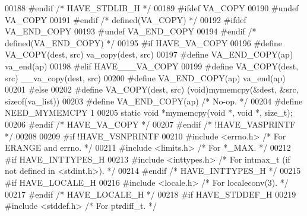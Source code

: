 \begin{DoxyCode}
{00188 \textcolor{preprocessor}{#endif  }\textcolor{comment}{/* HAVE\_STDLIB\_H */}\textcolor{preprocessor}{}
00189 \textcolor{preprocessor}{#ifdef VA\_COPY}
00190 \textcolor{preprocessor}{#undef VA\_COPY}
00191 \textcolor{preprocessor}{#endif  }\textcolor{comment}{/* defined(VA\_COPY) */}\textcolor{preprocessor}{}
00192 \textcolor{preprocessor}{#ifdef VA\_END\_COPY}
00193 \textcolor{preprocessor}{#undef VA\_END\_COPY}
00194 \textcolor{preprocessor}{#endif  }\textcolor{comment}{/* defined(VA\_END\_COPY) */}\textcolor{preprocessor}{}
00195 \textcolor{preprocessor}{#if HAVE\_VA\_COPY}
00196 \textcolor{preprocessor}{#define VA\_COPY(dest, src) va\_copy(dest, src)}
00197 \textcolor{preprocessor}{#define VA\_END\_COPY(ap) va\_end(ap)}
00198 \textcolor{preprocessor}{#elif HAVE\_\_\_VA\_COPY}
00199 \textcolor{preprocessor}{#define VA\_COPY(dest, src) \_\_va\_copy(dest, src)}
00200 \textcolor{preprocessor}{#define VA\_END\_COPY(ap) va\_end(ap)}
00201 \textcolor{preprocessor}{#else}
00202 \textcolor{preprocessor}{#define VA\_COPY(dest, src) (void)mymemcpy(&dest, &src, sizeof(va\_list))}
00203 \textcolor{preprocessor}{#define VA\_END\_COPY(ap) }\textcolor{comment}{/* No-op. */}\textcolor{preprocessor}{}
00204 \textcolor{preprocessor}{#define NEED\_MYMEMCPY 1}
00205 \textcolor{keyword}{static} \textcolor{keywordtype}{void} *mymemcpy(\textcolor{keywordtype}{void} *, \textcolor{keywordtype}{void} *, \textcolor{keywordtype}{size\_t});
00206 \textcolor{preprocessor}{#endif  }\textcolor{comment}{/* HAVE\_VA\_COPY */}\textcolor{preprocessor}{}
00207 \textcolor{preprocessor}{#endif  }\textcolor{comment}{/* !HAVE\_VASPRINTF */}\textcolor{preprocessor}{}
00208 
00209 \textcolor{preprocessor}{#if !HAVE\_VSNPRINTF}
00210 \textcolor{preprocessor}{#include <errno.h>}  \textcolor{comment}{/* For ERANGE and errno. */}
00211 \textcolor{preprocessor}{#include <limits.h>} \textcolor{comment}{/* For *\_MAX. */}
00212 \textcolor{preprocessor}{#if HAVE\_INTTYPES\_H}
00213 \textcolor{preprocessor}{#include <inttypes.h>}   \textcolor{comment}{/* For intmax\_t (if not defined in <stdint.h>). */}
00214 \textcolor{preprocessor}{#endif  }\textcolor{comment}{/* HAVE\_INTTYPES\_H */}\textcolor{preprocessor}{}
00215 \textcolor{preprocessor}{#if HAVE\_LOCALE\_H}
00216 \textcolor{preprocessor}{#include <locale.h>} \textcolor{comment}{/* For localeconv(3). */}
00217 \textcolor{preprocessor}{#endif  }\textcolor{comment}{/* HAVE\_LOCALE\_H */}\textcolor{preprocessor}{}
00218 \textcolor{preprocessor}{#if HAVE\_STDDEF\_H}
00219 \textcolor{preprocessor}{#include <stddef.h>} \textcolor{comment}{/* For ptrdiff\_t. */}
}
\end{DoxyCode}
